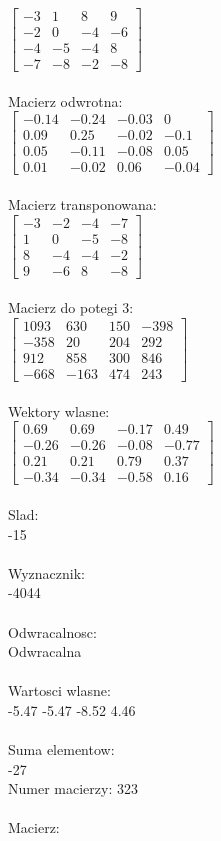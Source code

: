 \documentclass[a4paper,12pt]{article}
\begin{document}
$\begin{bmatrix} -3&1&8&9\\-2&0&-4&-6\\-4&-5&-4&8\\-7&-8&-2&-8 \end{bmatrix}$
\\
\\
Macierz odwrotna:\\

$\begin{bmatrix} -0.14&-0.24&-0.03&0\\0.09&0.25&-0.02&-0.1\\0.05&-0.11&-0.08&0.05\\0.01&-0.02&0.06&-0.04 \end{bmatrix}$
\\
\\
Macierz transponowana:\\

$\begin{bmatrix} -3&-2&-4&-7\\1&0&-5&-8\\8&-4&-4&-2\\9&-6&8&-8 \end{bmatrix}$
\\
\\
Macierz do potegi 3:\\

$\begin{bmatrix} 1093&630&150&-398\\-358&20&204&292\\912&858&300&846\\-668&-163&474&243 \end{bmatrix}$
\\
\\
Wektory wlasne:\\

$\begin{bmatrix} 0.69&0.69&-0.17&0.49\\-0.26&-0.26&-0.08&-0.77\\0.21&0.21&0.79&0.37\\-0.34&-0.34&-0.58&0.16 \end{bmatrix}$
\\
\\
Slad:\\
-15
\\
\\
Wyznacznik:\\
-4044
\\
\\
Odwracalnosc:\\
Odwracalna
\\
\\
Wartosci wlasne:\\
-5.47 -5.47 -8.52 4.46
\\
\\
Suma elementow:\\
-27
\\
\newpage
Numer macierzy:
323
\\
\\
Macierz:\\
\end{document}
